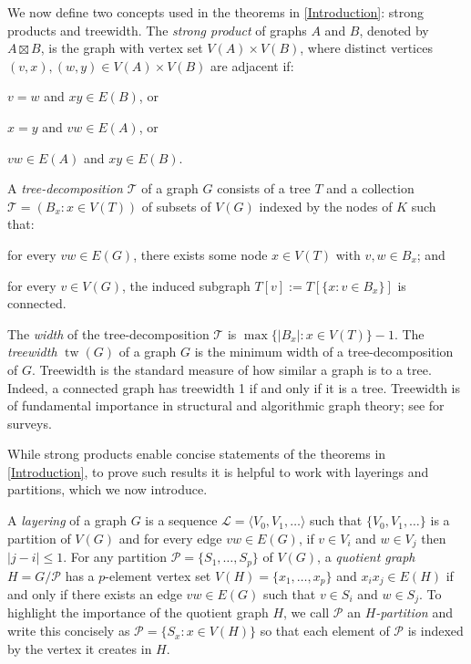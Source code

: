 \documentclass{patmorin}
\DeclareMathOperator{\tw}{tw}
\renewcommand{\leq}{\leqslant}
\begin{document}
We now define two concepts used in the theorems in \cref{Introduction}: strong products and treewidth. The \emph{strong product} of graphs $A$ and $B$, denoted by $A\boxtimes B$, is the graph with vertex set $V(A)\times V(B)$, where distinct vertices $(v,x),(w,y)\in V(A)\times V(B)$ are adjacent if: 
\begin{compactitem}
\item  $v=w$ and $xy\in E(B)$, or 
\item  $x=y$ and $vw\in E(A)$, or  
\item  $vw\in E(A)$ and $xy\in E(B)$. 
\end{compactitem}
A \emph{tree-decomposition} $\mathcal{T}$ of a graph $G$ consists of a tree $T$ and a collection $\mathcal{T}=(B_x:x\in V(T))$ of subsets of $V(G)$ indexed by the nodes of $K$ such that:
\begin{compactenum}[(i)]
\item for every $vw\in E(G)$, there exists some node $x\in V(T)$ with $v,w\in B_x$; and 
\item for every $v\in V(G)$, the induced subgraph $T[v] := T[\{x: v\in B_x\}]$ is connected.  
\end{compactenum}
The \emph{width} of the tree-decomposition $\mathcal{T}$ is $\max\{|B_x|:x\in V(T)\}-1$.  The \emph{treewidth} $\tw(G)$ of a graph $G$ is the minimum width of a tree-decomposition of $G$.  Treewidth is the standard measure of how similar a graph is to a tree. Indeed, a connected graph has treewidth 1 if and only if it is a tree. Treewidth is of fundamental importance in structural and algorithmic graph theory; see \citep{Reed03,HW17,Bodlaender-TCS98} for surveys. 

While strong products enable concise statements of the theorems in \cref{Introduction}, to prove such results it is helpful to work with layerings and partitions, which we now introduce. 

A \emph{layering} of a graph $G$ is a sequence $\mathcal{L}=\langle V_0,V_1,\ldots\rangle$ such that $\{V_0,V_1,\ldots\}$ is a partition of $V(G)$ and for every edge $vw\in E(G)$, if $v\in V_i$ and $w\in V_j$ then $|j-i|\leq 1$.  For any partition $\mathcal{P}=\{S_1,\ldots,S_p\}$ of $V(G)$, a \emph{quotient graph} $H=G/\mathcal{P}$ has a $p$-element vertex set $V(H)=\{x_1,\ldots,x_p\}$ and $x_ix_j\in E(H)$ if and only if there exists an edge $vw\in E(G)$ such that $v\in S_i$ and $w\in S_j$. To highlight the importance of the quotient graph $H$, we call $\mathcal{P}$ an \emph{$H$-partition} and write this concisely as $\mathcal{P}=\{S_x : x\in V(H)\}$ so that each element of $\mathcal{P}$ is indexed by the vertex it creates in $H$.  
\end{document}
